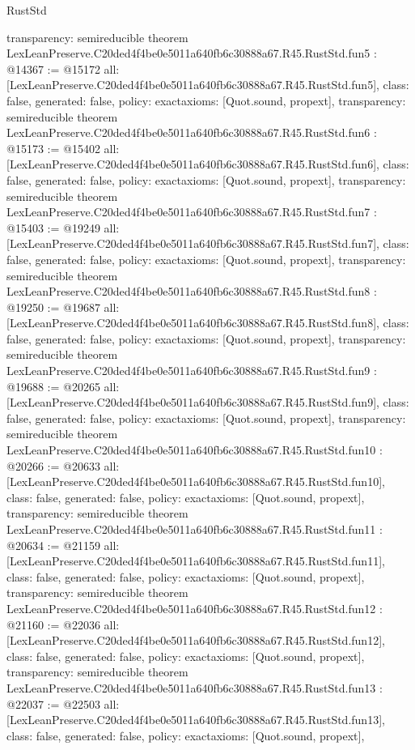\begin{lexlean}{RustStd}
\begin{coremodule}
{  transparency: semireducible
}
theorem LexLeanPreserve.C20ded4f4be0e5011a640fb6c30888a67.R45.RustStd.fun5 : @14367 := @15172 {
  all: [LexLeanPreserve.C20ded4f4be0e5011a640fb6c30888a67.R45.RustStd.fun5],
  class: false,
  generated: false,
  policy: exact{axioms: [Quot.sound, propext]},
  transparency: semireducible
}
theorem LexLeanPreserve.C20ded4f4be0e5011a640fb6c30888a67.R45.RustStd.fun6 : @15173 := @15402 {
  all: [LexLeanPreserve.C20ded4f4be0e5011a640fb6c30888a67.R45.RustStd.fun6],
  class: false,
  generated: false,
  policy: exact{axioms: [Quot.sound, propext]},
  transparency: semireducible
}
theorem LexLeanPreserve.C20ded4f4be0e5011a640fb6c30888a67.R45.RustStd.fun7 : @15403 := @19249 {
  all: [LexLeanPreserve.C20ded4f4be0e5011a640fb6c30888a67.R45.RustStd.fun7],
  class: false,
  generated: false,
  policy: exact{axioms: [Quot.sound, propext]},
  transparency: semireducible
}
theorem LexLeanPreserve.C20ded4f4be0e5011a640fb6c30888a67.R45.RustStd.fun8 : @19250 := @19687 {
  all: [LexLeanPreserve.C20ded4f4be0e5011a640fb6c30888a67.R45.RustStd.fun8],
  class: false,
  generated: false,
  policy: exact{axioms: [Quot.sound, propext]},
  transparency: semireducible
}
theorem LexLeanPreserve.C20ded4f4be0e5011a640fb6c30888a67.R45.RustStd.fun9 : @19688 := @20265 {
  all: [LexLeanPreserve.C20ded4f4be0e5011a640fb6c30888a67.R45.RustStd.fun9],
  class: false,
  generated: false,
  policy: exact{axioms: [Quot.sound, propext]},
  transparency: semireducible
}
theorem LexLeanPreserve.C20ded4f4be0e5011a640fb6c30888a67.R45.RustStd.fun10 : @20266 := @20633 {
  all: [LexLeanPreserve.C20ded4f4be0e5011a640fb6c30888a67.R45.RustStd.fun10],
  class: false,
  generated: false,
  policy: exact{axioms: [Quot.sound, propext]},
  transparency: semireducible
}
theorem LexLeanPreserve.C20ded4f4be0e5011a640fb6c30888a67.R45.RustStd.fun11 : @20634 := @21159 {
  all: [LexLeanPreserve.C20ded4f4be0e5011a640fb6c30888a67.R45.RustStd.fun11],
  class: false,
  generated: false,
  policy: exact{axioms: [Quot.sound, propext]},
  transparency: semireducible
}
theorem LexLeanPreserve.C20ded4f4be0e5011a640fb6c30888a67.R45.RustStd.fun12 : @21160 := @22036 {
  all: [LexLeanPreserve.C20ded4f4be0e5011a640fb6c30888a67.R45.RustStd.fun12],
  class: false,
  generated: false,
  policy: exact{axioms: [Quot.sound, propext]},
  transparency: semireducible
}
theorem LexLeanPreserve.C20ded4f4be0e5011a640fb6c30888a67.R45.RustStd.fun13 : @22037 := @22503 {
  all: [LexLeanPreserve.C20ded4f4be0e5011a640fb6c30888a67.R45.RustStd.fun13],
  class: false,
  generated: false,
  policy: exact{axioms: [Quot.sound, propext]},
}
\end{coremodule}
\end{lexlean}
